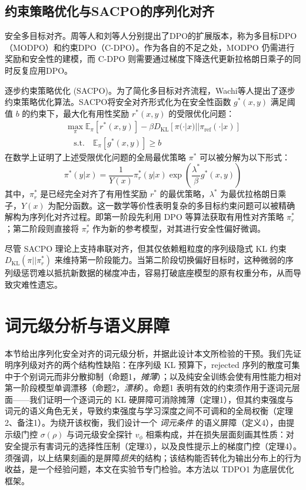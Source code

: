 \documentclass[lettersize,journal]{IEEEtran}
\begin{document}
\subsection{约束策略优化与SACPO的序列化对齐}
安全多目标对齐。周等人\cite{zhou2024beyond}和刘等人\cite{liu2024enhancing}分别提出了DPO的扩展版本，称为多目标DPO（MODPO）和约束DPO（C-DPO）。作为各自的不足之处，MODPO 仍需进行奖励和安全性的建模，而 C-DPO 则需要通过梯度下降迭代更新拉格朗日乘子的同时反复应用DPO。

逐步约束策略优化 (SACPO)\cite{wachi2024stepwise}。为了简化多目标对齐流程，Wachi等人提出了逐步约束策略优化算法。SACPO将安全对齐形式化为在安全性函数 $g^*(x, y)$ 满足阈值 $b$ 的约束下，最大化有用性奖励 $r^*(x, y)$ 的受限优化问题：
\begin{equation}
\begin{aligned}
    \max_{\pi} \mathbb{E}_{\pi}[r^*(x, y)] - \beta D_{\text{KL}}[\pi(\cdot|x) || \pi_{\text{ref}}(\cdot|x)]  \\ \quad \text{s.t.} \quad \mathbb{E}_{\pi}[g^*(x, y)] \ge b
\end{aligned}
\end{equation}
在数学上证明了上述受限优化问题的全局最优策略 $\pi^*$ 可以被分解为以下形式：
\begin{equation}
    \pi^*(y|x) = \frac{1}{Y(x)} \pi^*_r(y|x) \exp\left(\frac{\lambda^*}{\beta} g^*(x,y)\right)
\end{equation}
其中，$\pi^*_r$ 是已经完全对齐了有用性奖励 $r^*$ 的最优策略，$\lambda^*$ 为最优拉格朗日乘子，$Y(x)$ 为配分函数。这一数学等价性表明复杂的多目标约束问题可以被精确解构为序列化对齐过程。即第一阶段先利用 DPO 等算法获取有用性对齐策略 $\pi^*_r$；第二阶段则直接将 $\pi^*_r$ 作为新的参考模型，对其进行安全性偏好微调。

尽管 SACPO 理论上支持串联对齐，但其仅依赖粗粒度的序列级隐式 KL 约束 $D_{\text{KL}}(\pi || \pi^*_r)$ 来维持第一阶段能力。当第二阶段切换偏好目标时，这种微弱的序列级惩罚难以抵抗新数据的梯度冲击，容易打破底座模型的原有权重分布，从而导致灾难性遗忘。

\section{词元级分析与语义屏障}
本节给出序列化安全对齐的词元级分析，并据此设计本文所检验的干预。我们先证明序列级对齐的两个结构性缺陷：在序列级 KL 预算下，rejected 序列的散度可集中于个别词元而非分散抑制（命题1，\textit{摊薄}）；以及纯安全训练会使有用性能力相对第一阶段模型单调漂移（命题2，\textit{漂移}）。命题1 表明有效的约束须作用于逐词元层面——我们证明一个逐词元的 KL 硬屏障可消除摊薄（定理1），但其约束强度与词元的语义角色无关，导致约束强度与学习深度之间不可调和的全局权衡（定理2、备注1）。为绕开该权衡，我们设计一个 \textit{词元条件} 的语义屏障（定义4），由提示级门控 $\sigma(\rho)$ 与词元级安全探针 $v_\phi$ 相乘构成，并在损失层面刻画其性质：对安全提示有害词元的选择性压制（定理3），以及良性提示上的梯度门控（定理4）。须强调，以上结果刻画的是屏障\textit{损失}的结构；该结构能否转化为输出分布上的行为收益，是一个经验问题，本文在实验节专门检验。本方法以 TDPO1\cite{zeng2024token} 为底层优化框架。
\end{document}
